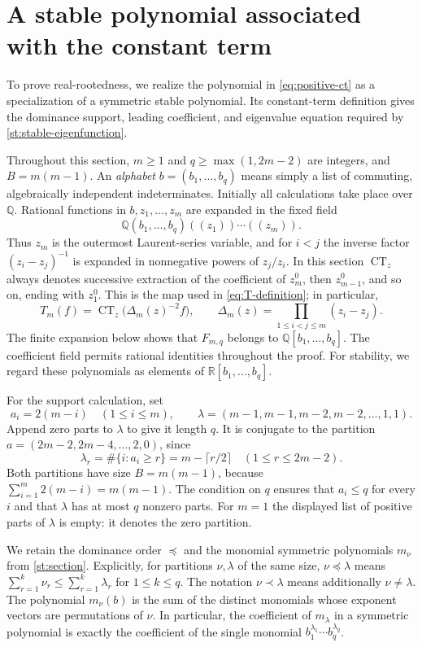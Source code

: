 \documentclass[reqno, 12pt]{article}
\numberwithin{equation}{section}
\theoremstyle{definition}
\DeclareMathOperator{\CT}{CT}
\begin{document}
\section{A stable polynomial associated with the constant term}
\label{ct:section}

To prove real-rootedness, we realize the polynomial in
\eqref{eq:positive-ct} as a specialization of a symmetric stable
polynomial.  Its constant-term definition gives the dominance support,
leading coefficient, and eigenvalue equation required by \cref{st:stable-eigenfunction}.

Throughout this section, $m\geq1$ and
$q\geq\max(1,2m-2)$ are integers, and $B=m(m-1)$.  An
\emph{alphabet} $b=(b_1,\ldots,b_q)$ means simply a list of
commuting, algebraically independent indeterminates.  Initially all
calculations take place over $\mathbb Q$.  Rational functions in
$b,z_1,\ldots,z_m$ are expanded in the fixed field
\[
 \mathbb Q(b_1,\ldots,b_q)((z_1))\cdots((z_m)).
\]
Thus $z_m$ is the outermost Laurent-series variable, and for $i<j$
the inverse factor $(z_i-z_j)^{-1}$ is expanded in nonnegative
powers of $z_j/z_i$.  In this
section $\CT_z$ always denotes successive extraction of the
coefficient of $z_m^0$, then $z_{m-1}^0$, and so on, ending with
$z_1^0$.  This is the map used in \eqref{eq:T-definition}; in
particular,
\[
 T_m(f)=\CT_z\bigl(\Delta_m(z)^{-2}f\bigr),
 \qquad \Delta_m(z)=\prod_{1\leq i<j\leq m}(z_i-z_j).
\]
The finite expansion below shows that $F_{m,q}$ belongs to
$\mathbb Q[b_1,\ldots,b_q]$.  The coefficient field permits rational
identities throughout the proof.  For stability, we regard these
polynomials as elements of $\mathbb R[b_1,\ldots,b_q]$.

For the support calculation, set
\begin{equation}\label{ct:partitions}
 a_i=2(m-i)\quad(1\leq i\leq m),\qquad
 \lambda=(m-1,m-1,m-2,m-2,\ldots,1,1).
\end{equation}
Append zero parts to $\lambda$ to give it length $q$.  It is conjugate
to the partition $a=(2m-2,2m-4,\ldots,2,0)$, since
\[
 \lambda_r=\#\{i:a_i\geq r\}
 =m-\lceil r/2\rceil\quad(1\leq r\leq2m-2).
\]
Both partitions have size $B=m(m-1)$, because
$\sum_{i=1}^m2(m-i)=m(m-1)$.  The condition on $q$ ensures that
$a_i\leq q$ for every $i$ and that $\lambda$ has at most $q$
nonzero parts.  For $m=1$ the displayed list of positive parts of
$\lambda$ is empty: it denotes the zero partition.

We retain the dominance order $\preceq$ and the monomial
symmetric polynomials $m_\nu$ from \cref{st:section}.
Explicitly, for partitions $\nu,\lambda$ of the same size,
$\nu\preceq\lambda$ means
$\sum_{r=1}^k\nu_r\leq\sum_{r=1}^k\lambda_r$ for
$1\leq k\leq q$.  The notation $\nu\prec\lambda$
means additionally $\nu\ne\lambda$.  The polynomial $m_\nu(b)$
is the sum of the distinct monomials whose exponent vectors are
permutations of $\nu$.  In particular, the coefficient of
$m_\lambda$ in a symmetric polynomial is exactly the coefficient
of the single monomial $b_1^{\lambda_1}\cdots b_q^{\lambda_q}$.
\end{document}

